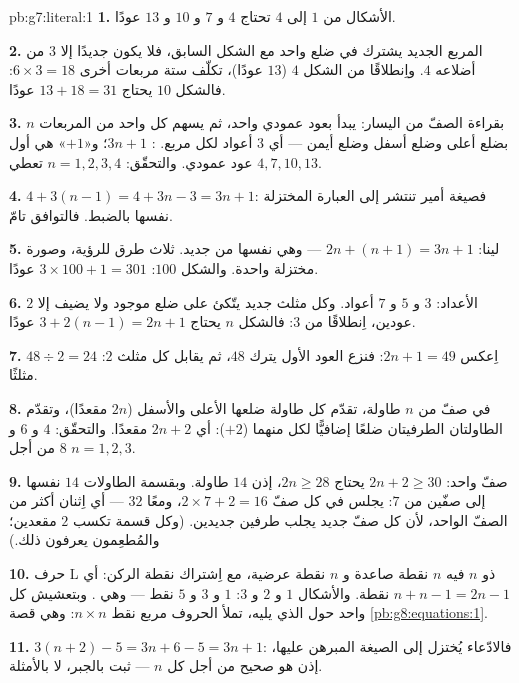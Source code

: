 \begin{solution}{pb:g7:literal:1}
\textbf{1.} الأشكال من $1$ إلى $4$ تحتاج $4$ و $7$ و $10$ و $13$
عودًا.

\textbf{2.} المربع الجديد يشترك في ضلع واحد مع الشكل
السابق، فلا يكون جديدًا إلا $3$ من أضلاعه $4$. واِنطلاقًا من
الشكل $4$ ($13$ عودًا)، تكلّف ستة مربعات أخرى
$6 \times 3 = 18$: فالشكل $10$ يحتاج $13 + 18 = 31$ عودًا.

\textbf{3.} بقراءة الصفّ من اليسار: يبدأ بعود
عمودي واحد، ثم يسهم كل واحد من المربعات $n$ بضلع
أعلى وضلع أسفل وضلع أيمن --- أي $3$ أعواد لكل مربع. :
$3n + 1$؛ و«$+1$» هي أول عود عمودي. والتحقّق:
$n = 1, 2, 3, 4$ تعطي $4, 7, 10, 13$.

\textbf{4.} $4 + 3(n - 1) = 4 + 3n - 3 = 3n + 1$: فصيغة أمير
تنتشر إلى العبارة المختزلة نفسها بالضبط. فالتوافق
تامّ.

\textbf{5.} لينا: $2n + (n + 1) = 3n + 1$ --- وهي نفسها من جديد.
ثلاث طرق للرؤية، وصورة مختزلة واحدة. والشكل $100$:
$3 \times 100 + 1 = 301$ عودًا.

\textbf{6.} الأعداد: $3$ و $5$ و $7$ أعواد. وكل مثلث جديد
يتّكئ على ضلع موجود ولا يضيف إلا $2$ عودين، اِنطلاقًا
من $3$: فالشكل $n$ يحتاج $3 + 2(n - 1) = 2n + 1$ عودًا.

\textbf{7.} اِعكس $2n + 1 = 49$: فنزع العود الأول يترك
$48$، ثم يقابل كل مثلث $2$:
$48 \div 2 = 24$ مثلثًا.

\textbf{8.} في صفّ من $n$ طاولة، تقدّم كل طاولة ضلعها
الأعلى والأسفل ($2n$ مقعدًا)، وتقدّم الطاولتان الطرفيتان ضلعًا
إضافيًّا لكل منهما ($+2$): أي $2n + 2$ مقعدًا. والتحقّق: $4$ و $6$ و $8$
من أجل $n = 1, 2, 3$.

\textbf{9.} صفّ واحد: $2n + 2 \geq 30$ يحتاج $2n \geq 28$، إذن
$14$ طاولة. وبقسمة الطاولات $14$ نفسها إلى صفّين من
$7$: يجلس في كل صفّ $2 \times 7 + 2 = 16$، ومعًا $32$ ---
أي اِثنان أكثر من الصفّ الواحد، لأن كل صفّ جديد يجلب طرفين
جديدين. (وكل قسمة تكسب $2$ مقعدين؛ والمُطعِمون يعرفون ذلك.)

\textbf{10.} حرف L ذو  $n$ فيه $n$ نقطة صاعدة و $n$
نقطة عرضية، مع اِشتراك نقطة الركن: أي $n + n - 1 = 2n - 1$ نقطة.
والأشكال $1$ و $2$ و $3$: $1$ و $3$ و $5$ نقط --- وهي \emph{}. وبتعشيش كل واحد حول الذي يليه، تملأ الحروف
مربع نقط $n \times n$: وهي قصة
\cref{pb:g8:equations:1}.

\textbf{11.} $3(n + 2) - 5 = 3n + 6 - 5 = 3n + 1$: فالادّعاء
يُختزل إلى الصيغة المبرهن عليها، إذن هو صحيح من أجل كل $n$ ---
ثبت بالجبر، لا بالأمثلة.


\end{solution}
